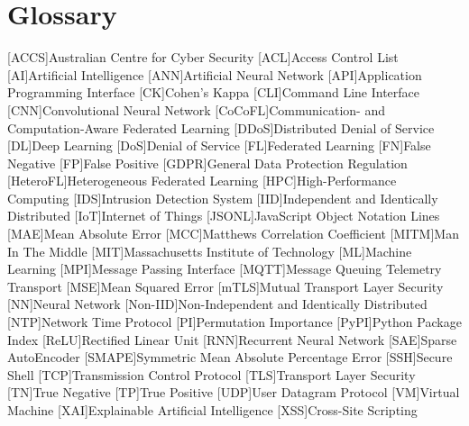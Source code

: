 \chapter{Glossary}

\footnotesize
\SingleSpacing

\begin{multicols}{2}
\begin{acronym}[AAAAAA]

[ACCS]{Australian Centre for Cyber Security}
[ACL]{Access Control List}
[AI]{Artificial Intelligence}
[ANN]{Artificial Neural Network}
[API]{Application Programming Interface}
[CK]{Cohen's Kappa}
[CLI]{Command Line Interface}
[CNN]{Convolutional Neural Network}
[CoCoFL]{Communication- and Computation-Aware Federated Learning}
[DDoS]{Distributed Denial of Service}
[DL]{Deep Learning}
[DoS]{Denial of Service}
[FL]{Federated Learning}
[FN]{False Negative}
[FP]{False Positive}
[GDPR]{General Data Protection Regulation}
[HeteroFL]{Heterogeneous Federated Learning}
[HPC]{High-Performance Computing}
[IDS]{Intrusion Detection System}
[IID]{Independent and Identically Distributed}
[IoT]{Internet of Things}
[JSONL]{JavaScript Object Notation Lines}
[MAE]{Mean Absolute Error}
[MCC]{Matthews Correlation Coefficient}
[MITM]{Man In The Middle}
[MIT]{Massachusetts Institute of Technology}
[ML]{Machine Learning}
[MPI]{Message Passing Interface}
[MQTT]{Message Queuing Telemetry Transport}
[MSE]{Mean Squared Error}
[mTLS]{Mutual Transport Layer Security}
[NN]{Neural Network}
[Non-IID]{Non-Independent and Identically Distributed}
[NTP]{Network Time Protocol}
[PI]{Permutation Importance}
[PyPI]{Python Package Index}
[ReLU]{Rectified Linear Unit}
[RNN]{Recurrent Neural Network}
[SAE]{Sparse AutoEncoder}
[SMAPE]{Symmetric Mean Absolute Percentage Error}
[SSH]{Secure Shell}
[TCP]{Transmission Control Protocol}
[TLS]{Transport Layer Security}
[TN]{True Negative}
[TP]{True Positive}
[UDP]{User Datagram Protocol}
[VM]{Virtual Machine}
[XAI]{Explainable Artificial Intelligence}
[XSS]{Cross-Site Scripting}

\end{acronym}
\end{multicols}

